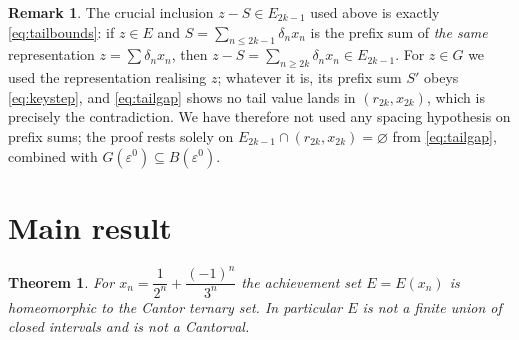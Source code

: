 \documentclass{amsart}
\newtheorem{theorem}{Theorem}
\theoremstyle{definition}
\newtheorem*{remark}{Remark}
\begin{document}
\begin{remark}
The crucial inclusion $z-S\in E_{2k-1}$ used above is exactly \eqref{eq:tailbounds}: if
$z\in E$ and $S=\sum_{n\le2k-1}\delta_n x_n$ is the prefix sum of \emph{the same}
representation $z=\sum\delta_n x_n$, then $z-S=\sum_{n\ge2k}\delta_n x_n\in E_{2k-1}$. For
$z\in G$ we used the representation realising $z$; whatever it is, its prefix sum $S'$ obeys
\eqref{eq:keystep}, and \eqref{eq:tailgap} shows no tail value lands in $(r_{2k},x_{2k})$,
which is precisely the contradiction. We have therefore not used any spacing hypothesis on
prefix sums; the proof rests solely on $E_{2k-1}\cap(r_{2k},x_{2k})=\varnothing$ from
\eqref{eq:tailgap}, combined with $G(\varepsilon^0)\subseteq B(\varepsilon^0)$.
\end{remark}

\section{Main result}

\begin{theorem}\label{thm:main}
For $x_n=\dfrac{1}{2^n}+\dfrac{(-1)^n}{3^n}$ the achievement set $E=E(x_n)$ is homeomorphic to
the Cantor ternary set. In particular $E$ is \emph{not} a finite union of closed intervals and
is \emph{not} a Cantorval.
\end{theorem}
\end{document}
